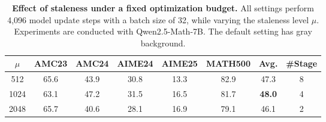 
\begin{table}[t]
\centering
\setlength{\tabcolsep}{0.47cm}
\caption{\textbf{Effect of staleness under a fixed optimization budget.}
All settings perform 4{,}096 model update steps with a batch size of 32,
while varying the staleness level $\mu$. Experiments are conducted with Qwen2.5-Math-7B. The default setting has gray background.} 
\label{tab:staleness_ablation}
\small
\begin{tabular}{cccccccc}
\toprule
\scriptsize $\mu$
& \scriptsize AMC23
& \scriptsize AMC24
& \scriptsize AIME24
& \scriptsize AIME25
& \scriptsize MATH500
& \scriptsize Avg.
& \scriptsize \#Stage \\
\midrule
512  & 65.6 & 43.9 & 30.8 & 13.3 & 82.9 & 47.3 & 8 \\
\rowcolor{gray!20} 1024  & 63.1 & 47.2 & 31.5 & 16.5 & 81.7 & \textbf{48.0} & 4 \\
2048 
  & 65.7 & 40.6 & 28.1 & 16.9 & 79.1 & 46.1 & 2 \\
\bottomrule
\end{tabular}

\end{table}

